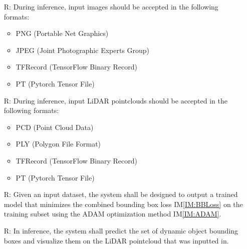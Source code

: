 \documentclass[12pt]{article}
\newcommand{\iref}[1]{IM\ref{#1}}
\newcounter{reqnum} %
\begin{document}
\noindent \begin{itemize}

\item[R\refstepcounter{reqnum}\thereqnum \label{Req:CamIn}:] During inference, input images should be accepted in the following formats:
\begin{itemize}
  \item PNG (Portable Net Graphics)
  \item JPEG (Joint Photographic Experts Group)
  \item TFRecord (TensorFlow Binary Record)
  \item PT (Pytorch Tensor File)
\end{itemize}

\item[R\refstepcounter{reqnum}\thereqnum \label{Req:LiDARIn}:] During inference, input LiDAR pointclouds should be accepted in the following formats:
\begin{itemize}
  \item PCD (Point Cloud Data)
  \item PLY (Polygon File Format)
  \item TFRecord (TensorFlow Binary Record)
  \item PT (Pytorch Tensor File)
\end{itemize}

\item[R\refstepcounter{reqnum}\thereqnum \label{Req:Optim}:] Given an input dataset, the system shall be designed to output a trained model that minimizes 
the combined bounding box loss \iref{IM:BBLoss} on the training subset using the ADAM optimization method \iref{IM:ADAM}. 

\item[R\refstepcounter{reqnum}\thereqnum \label{Req:Vis}:] In inference, the system shall predict the set of dynamic object bounding boxes and visualize
them on the LiDAR pointcloud that was inputted in.

\end{itemize}
\end{document}
